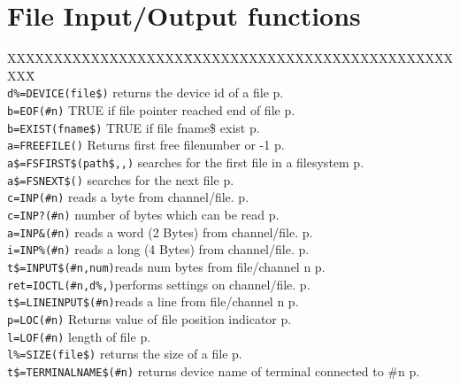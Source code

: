 \section{File Input/Output functions}
\begin{tabbing}
XXXXXXXXXXXXXXXXXXX\=XXXXXXXXXXXXXXXXXXXXXXXXXXXXXXXX\=\kill\\
\verb|d%=DEVICE(file$)|	\>returns the device id of a file \> p.\pageref{DEVICE}\\
\verb|b=EOF(#n)|	\>TRUE if file pointer reached end of file\> p.\pageref{EOF}\\
\verb|b=EXIST(fname$)| 	\>TRUE if file fname\$ exist\> p.\pageref{EXIST}\\
\verb|a=FREEFILE()|	\>Returns first free filenumber or -1\> p.\pageref{FREEFILE}\\
\verb|a$=FSFIRST$(path$,,)| \>searches for the first file in a filesystem\> p.\pageref{FSFIRSTS}\\
\verb|a$=FSNEXT$()|  	\>searches for the next file\> p.\pageref{FSNEXTS}\\
\verb|c=INP(#n)|	\>reads a byte  from channel/file.\> p.\pageref{INP}\\
\verb|c=INP?(#n)|	\>number of bytes which can be read \> p.\pageref{INPf}\\
\verb|a=INP&(#n)|	\>reads a word (2 Bytes) from channel/file.\> p.\pageref{INPu}\\
\verb|i=INP%(#n)|	\>reads a long (4 Bytes) from channel/file.\> p.\pageref{INPi}\\
\verb|t$=INPUT$(#n,num)|\>reads num bytes from file/channel n\> p.\pageref{INPUTS}\\
\verb|ret=IOCTL(#n,d%,)|\>performs settings on channel/file.\> p.\pageref{IOCTL}\\
\verb|t$=LINEINPUT$(#n)|\>reads a line from file/channel n\> p.\pageref{LINEINPUTS}\\
\verb|p=LOC(#n)|	\>Returns value of file position indicator\> p.\pageref{LOC}\\
\verb|l=LOF(#n)|	\>length of file\> p.\pageref{LOF}\\
\verb|l%=SIZE(file$)|	\>returns the size of a file \> p.\pageref{SIZE}\\
\verb|t$=TERMINALNAME$(#n)| \>	returns device name of terminal connected to \#n\> p.\pageref{TERMINALNAMES}\\
\end{tabbing}

